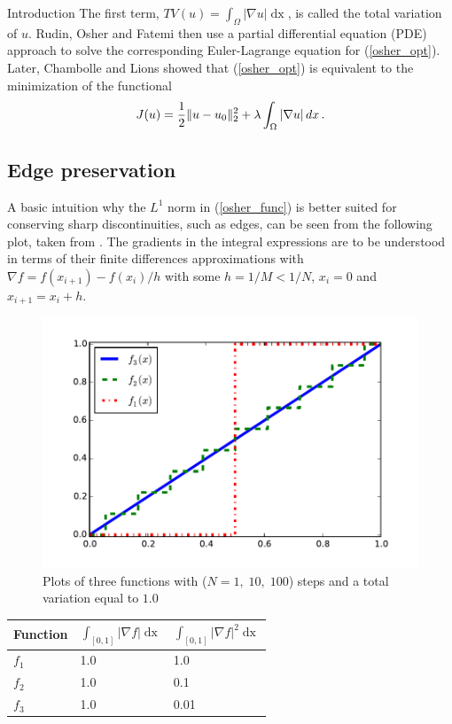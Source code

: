 \begin{chapter}{Introduction}
The first term, $TV(u)=\int_\Omega\left\vert\nabla u\right\vert\mathop{dx}$, is called the total variation of $u$. Rudin, Osher and Fatemi then use a partial differential equation (PDE) approach to solve
the corresponding Euler-Lagrange equation for (\ref{osher_opt}). Later, Chambolle and Lions \cite{ChambolleLions} showed that (\ref{osher_opt}) is equivalent to the minimization of
the functional
\begin{equation}
    \label{osher_func}
    J(u)=\frac{1}{2}\| u-u_0 \|_2^2 +\lambda \int_\Omega\left\vert\nabla u\right\vert\mathop{dx}.
\end{equation}

\subsection{Edge preservation} %
\label{sub:Edge preservation}
A basic intuition why the $L^1$ norm in (\ref{osher_func}) is better suited for conserving sharp discontinuities, such as edges, can be seen from the following plot, taken from \cite{SceneFlow}. The gradients in the integral expressions are to be understood in terms of their finite differences approximations with $\nabla f=f(x_{i+1})-f(x_i)/h$ with some $h=1/M<1/N$, $x_i=0$ and $x_{i+1}=x_i+h$.\\
 
\begin{figure}[h!]
        \centering
	    \includegraphics[width=0.9\linewidth]{./figures/introduction/tv12comparison.pdf}
	\caption[Comparison total variation]{Plots of three functions with ($N=1,\;10,\;100$) steps and a total variation equal to $1.0$}
	\label{fig:tv12comparison}
\end{figure}
\begin{table}[h!]
\centering
\begin{tabular}{|l|l|l|}
    \hline
    \textbf{Function} & $\int_{[0,1]}\left\vert\nabla f\right\vert\mathop{dx}$ & $\int_{[0,1]}\left\vert\nabla f\right\vert^2\mathop{dx}$ \\
    \hline
    $f_1$ & 1.0 & 1.0 \\
    $f_2$ & 1.0 & 0.1 \\
    $f_3$ & 1.0 & 0.01 \\
    \hline
\end{tabular}
\end{table}


\end{chapter}
